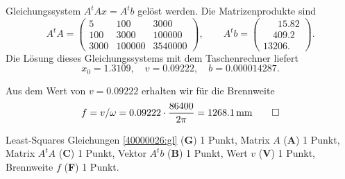 \begin{loesung}
\begin{teilaufgaben}
Gleichungssystem $A^tAx=A^tb$ gelöst werden.
Die Matrizenprodukte sind
\[
A^tA
=
\begin{pmatrix}
   5&   100&   3000\\
 100&  3000& 100000\\
3000&100000&3540000
\end{pmatrix},
\qquad
A^tb
=
\begin{pmatrix}
\phantom{000}15.82\\
\phantom{00}409.2\phantom{0}\\
13206.\phantom{00}
\end{pmatrix}.
\]
Die Lösung dieses Gleichungssystems mit dem Taschenrechner liefert
\[
x_0 = 1.3109,\quad
v=0.09222,\quad
b=0.000014287.
\]
\item
Aus dem Wert von $v=0.09222$ erhalten wir für die Brennweite
\[
f
=
v/\omega
=
0.09222\cdot \frac{86400}{2\pi}
=
1268.1\, \text{mm}
\qedhere
\]
\end{teilaufgaben}
\end{loesung}


\begin{bewertung}
Least-Squares Gleichungen \eqref{40000026:gl} ({\bf G}) 1 Punkt,
Matrix $A$ ({\bf A}) 1 Punkt,
Matrix $A^tA$ ({\bf C}) 1 Punkt,
Vektor $A^tb$ ({\bf B}) 1 Punkt,
Wert $v$ ({\bf V}) 1 Punkt,
Brennweite $f$ ({\bf F}) 1 Punkt.
\end{bewertung}
